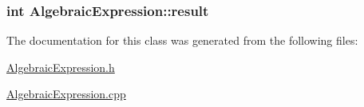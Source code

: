 \subsubsection[{\texorpdfstring{result}{result}}]{\setlength{\rightskip}{0pt plus 5cm}int Algebraic\+Expression\+::result\hspace{0.3cm}{\ttfamily [private]}}\hypertarget{classAlgebraicExpression_a13af7ae171ff8616e6ab013a9cee9d75}{}\label{classAlgebraicExpression_a13af7ae171ff8616e6ab013a9cee9d75}


The documentation for this class was generated from the following files\+:\begin{DoxyCompactItemize}
\item 
\hyperlink{AlgebraicExpression_8h}{Algebraic\+Expression.\+h}\item 
\hyperlink{AlgebraicExpression_8cpp}{Algebraic\+Expression.\+cpp}\end{DoxyCompactItemize}
